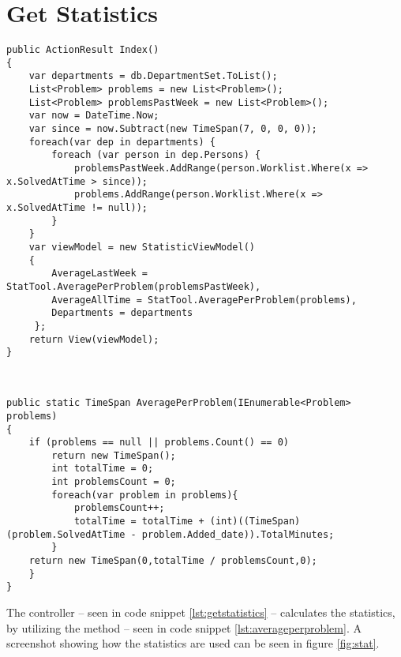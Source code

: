 \section{Get Statistics}
\label{sec:getstatistics}


\begin{nopagebreak}
\begin{lstlisting}[style=sourceCode, caption=\myCaption{The StatisticsController controller}, label=lst:getstatistics]
public ActionResult Index()
{
	var departments = db.DepartmentSet.ToList();
	List<Problem> problems = new List<Problem>();
	List<Problem> problemsPastWeek = new List<Problem>();
	var now = DateTime.Now;
	var since = now.Subtract(new TimeSpan(7, 0, 0, 0));
	foreach(var dep in departments)	{
		foreach (var person in dep.Persons) {
			problemsPastWeek.AddRange(person.Worklist.Where(x => x.SolvedAtTime > since));
			problems.AddRange(person.Worklist.Where(x => x.SolvedAtTime != null));
		}
	}
	var viewModel = new StatisticViewModel()
	{
		AverageLastWeek = StatTool.AveragePerProblem(problemsPastWeek),
		AverageAllTime = StatTool.AveragePerProblem(problems),
		Departments = departments
	 };
	return View(viewModel);
}


\end{lstlisting}



\vspace{-5mm}
\begin{lstlisting}[style=sourceCode, caption=\myCaption{The AveragePerProblem method}, label=lst:averageperproblem]%

public static TimeSpan AveragePerProblem(IEnumerable<Problem> problems)
{
	if (problems == null || problems.Count() == 0)
		return new TimeSpan();
		int totalTime = 0; 
		int problemsCount = 0;
		foreach(var problem in problems){
			problemsCount++;
			totalTime = totalTime + (int)((TimeSpan)(problem.SolvedAtTime - problem.Added_date)).TotalMinutes;
		}
	return new TimeSpan(0,totalTime / problemsCount,0);  
	}
}

\end{lstlisting}

The  controller -- seen in code snippet \ref{lst:getstatistics} -- calculates the statistics, by utilizing the  method -- seen in code snippet \ref{lst:averageperproblem}. A screenshot showing how the statistics are used can be seen in figure \ref{fig:stat}.

\end{nopagebreak}
\nopagebreak[4]
\newpage
